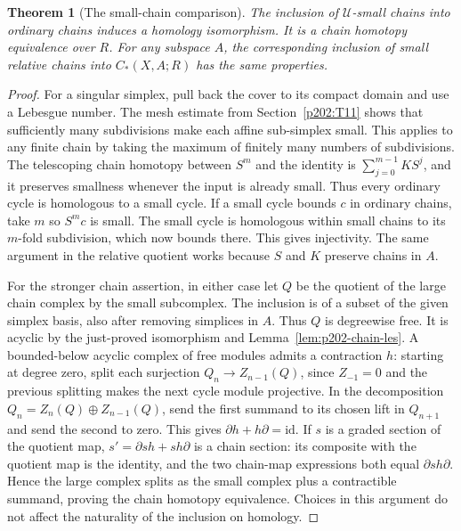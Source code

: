 \documentclass[11pt,oneside,openany]{book}
\theoremstyle{plain}
\newtheorem{theorem}{Theorem}[chapter]
\theoremstyle{definition}
\theoremstyle{remark}
\begin{document}
\begin{theorem}[The small-chain comparison]
\label{thm:p202-small-chains}
The inclusion of \(\mathcal U\)-small chains into ordinary
chains induces a homology isomorphism. It is a chain
homotopy equivalence over \(R\). For any subspace \(A\),
the corresponding inclusion of small relative chains
into \(C_*(X,A;R)\) has the same properties.
\end{theorem}

\begin{proof}
For a singular simplex, pull back the cover to its compact
domain and use a Lebesgue number. The mesh estimate from
Section~\ref{p202:T11} shows that sufficiently many
subdivisions make each affine sub-simplex small. This
applies to any finite chain by taking the maximum of
finitely many numbers of subdivisions. The telescoping
chain homotopy between \(S^m\) and the identity is
\(\sum_{j=0}^{m-1} KS^j\), and it preserves smallness
whenever the input is already small. Thus every ordinary
cycle is homologous to a small cycle. If a small cycle
bounds \(c\) in ordinary chains, take \(m\) so \(S^m c\)
is small. The small cycle is homologous within small
chains to its \(m\)-fold subdivision, which now bounds
there. This gives injectivity. The same argument in
the relative quotient works because \(S\) and \(K\)
preserve chains in \(A\).

For the stronger chain assertion, in either case let
\(Q\) be the quotient of the large chain complex by
the small subcomplex. The inclusion is of a subset
of the given simplex basis, also after removing
simplices in \(A\). Thus \(Q\) is degreewise free.
It is acyclic by the just-proved isomorphism and
Lemma~\ref{lem:p202-chain-les}. A bounded-below
acyclic complex of free modules admits a contraction
\(h\): starting at degree zero, split each surjection
\(Q_n\to Z_{n-1}(Q)\), since \(Z_{-1}=0\) and the
previous splitting makes the next cycle module
projective. In the decomposition
\(Q_n=Z_n(Q)\oplus Z_{n-1}(Q)\), send the first
summand to its chosen lift in \(Q_{n+1}\) and send
the second to zero. This gives
\(\partial h+h\partial=\mathrm{id}\).
If \(s\) is a graded section of the quotient map,
\(s'=\partial s h+s h\partial\) is a chain section:
its composite with the quotient map is the identity,
and the two chain-map expressions both equal
\(\partial s h\partial\).
Hence the large complex splits as the small complex
plus a contractible summand, proving the chain homotopy
equivalence. Choices in this argument do not affect the
naturality of the inclusion on homology.
\end{proof}
\end{document}
